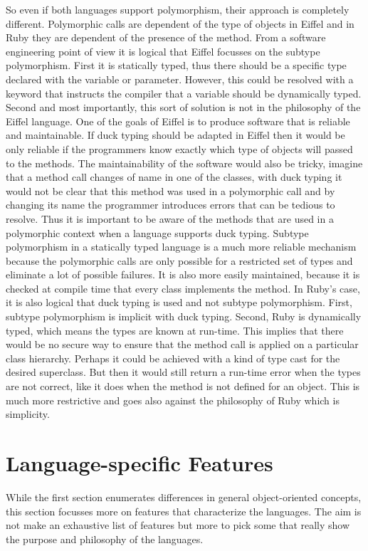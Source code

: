 \documentclass[12pt,a4paper,twocolumn]{article}
\begin{document}
So even if both languages support polymorphism, their approach is completely different. Polymorphic calls are dependent of the type of objects in Eiffel and in Ruby they are dependent of the presence of the method. From a software engineering point of view it is logical that Eiffel focusses on the subtype polymorphism. First it is statically typed, thus there should be a specific type declared with the variable or parameter. However, this could be resolved with a keyword that instructs the compiler that a variable should be dynamically typed. Second and most importantly, this sort of solution is not in the philosophy of the Eiffel language. One of the goals of Eiffel is to produce software that is reliable and maintainable. If duck typing should be adapted in Eiffel then it would be only reliable if the programmers know exactly which type of objects will passed to the methods. The maintainability of the software would also be tricky, imagine that a method call changes of name in one of the classes, with duck typing it would not be clear that this method was used in a polymorphic call and by changing its name the programmer introduces errors that can be tedious to resolve. Thus it is important to be aware of the methods that are used in a polymorphic context when a language supports duck typing. Subtype polymorphism in a statically typed language is a much more reliable mechanism because the polymorphic calls are only possible for a restricted set of types and eliminate a lot of possible failures. It is also more easily maintained, because it is checked at compile time that every class implements the method. In Ruby's case, it is also logical that duck typing is used and not subtype polymorphism. First, subtype polymorphism is implicit with duck typing. Second, Ruby is dynamically typed, which means the types are known at run-time. This implies that there would be no secure way to ensure that the method call is applied on a particular class hierarchy. Perhaps it could be achieved with a kind of type cast for the desired superclass. But then it would still return a run-time error when the types are not correct, like it does when the method is not defined for an object. This is much more restrictive and goes also against the philosophy of Ruby which is simplicity.

\section{Language-specific Features}
While the first section enumerates differences in general object-oriented concepts, this section focusses more on features that characterize the languages. The aim is not make an exhaustive list of features but more to pick some that really show the purpose and philosophy of the languages.
\end{document}
